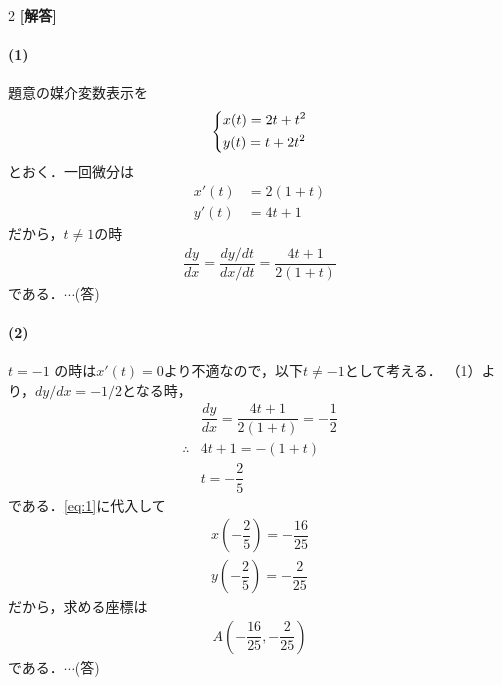 \documentclass[../../main.tex]{subfiles}
\begin{document}
\setcounter{equation}{0}
\begin{oframed}
  
\end{oframed}
\setlength{\columnseprule}{0.4pt}
\begin{multicols}{2}
  {\bf [解答]}
  \paragraph{(1)}
  題意の媒介変数表示を
  \begin{align}
    \begin{dcases}
      x(t) = 2t+t^2 \\
      y(t) = t+2t^2
    \end{dcases} \label{eq:1}
  \end{align}
  とおく．一回微分は
  \begin{align}
    x'(t) & = 2(1+t) \\
    y'(t) & = 4t+1
  \end{align}
  だから，$t\neq 1$の時
  \begin{align}
    \dfrac{dy}{dx} = \dfrac{dy/dt}{dx/dt} = \dfrac{4t+1}{2(1+t)}
  \end{align}
  である．$\cdots$(答)

  \paragraph{(2)}
  $t = -1$ の時は$x'(t)=0$より不適なので，以下$t \neq -1$として考える．
  （1）より，$dy/dx=-1/2$となる時，
  \begin{align}
    & \dfrac{dy}{dx} = \dfrac{4t+1}{2(1+t)} = -\dfrac{1}{2} \\
    \therefore
    & 4t+1 = -(1+t)                                      \\
    & t = -\dfrac{2}{5}
  \end{align}
  である．\cref{eq:1}に代入して
  \begin{align}
    x\left(-\dfrac{2}{5}\right) = -\dfrac{16}{25} \\
    y\left(-\dfrac{2}{5}\right) = -\dfrac{2}{25}
  \end{align}
  だから，求める座標は
  \begin{align}
    A\left(-\dfrac{16}{25}, -\dfrac{2}{25}\right)
  \end{align}
  である．$\cdots$(答)


\end{multicols}
\end{document}
